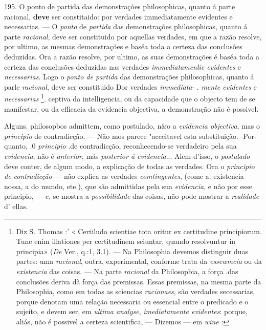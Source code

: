 195. O ponto de partida das demonstrações philosophicas, quanto á parte racional, \textbf{deve} ser constitaido: por verdades immediatamente evidentes e necessarias. --- O \emph{ponto} de \emph{partida} das demonstrações philosophicas, quanto á parte \emph{racional}, deve ser constituido por aquellas verdades, em que a razão resolve, por ultimo, as mesmas demonstrações e baséa toda a certeza das conclusões deduzidas. Ora a razão resolve, por ultimo, as suas demonstrações é baséa toda a certeza das conclusões deduzidas nas verdades \emph{immediatamenlie evidentes} e \emph{necessarias}. Logo o \emph{ponto de partida} das demonstrações philosophicas, quanto á parle \emph{racional}, deve ser constituido Dor verdades \emph{immediata}- . \emph{mente evidentes} e \emph{necessarias} \footnote{Diz S. Thomas :' « Certiludo scientiae tota oritur ex certitudine principiorum. Tune enim illationes per certitudinem sciuntar, quando resolvuntur in principia» (\emph{De} Ver., q.:1, 3.1). --- Na Philosophia devemos distinguir duas partes: uma \emph{racional}, outra, experimental, conforme trata da \emph{essewmcia} ou da \emph{existencia} das coisas. --- Na parte \emph{racional} da Philosopbia, a força .das conclusões deriva dà força das premissas. Essas premissas, na mesma parte da Philosophia, como em todas as sciencias \emph{racionaes}, são verdades secessarias, porque denotam uma relação necessaria ou essencial entre o predicado e o sujeito, e devem ser, em \emph{ultima analyse}, \emph{imediatamente evidentes}: porque, aliás, não é possivel a certeza scientifica, --- Dizemos --- em \emph{wine} :}. ceptiva da intelligencia, ou da capacidade que o objecto tem de se manifestar, ou da efficacia da evidencia objectiva, a demonstração não é possivel.

Alguns. philosopbos admittem, como postulado, n\&o a \emph{evidencia objectiva}, mas o \emph{principio} de contradicção. --- Não mos parece "acceitavel esta substituição. -Por- quanto, .0 \emph{principio} .de contradicção, reconhecendo-se verdadeiro pela sua \emph{evidencia}, não é \emph{anterior}, más \emph{posterior á evidencia}... Alem d'isso, o \emph{postulado} deve conter, de algum modo, a explicação de todas as verdades. Ora o \emph{principio de contradicção} --- não explica as verdades \emph{comtingentes}, (come a. existencia nossa, a do mundo, ete.), que são admittidas pela sua \emph{evidencia}, e não por esse principio, --- c, se mostra a \emph{possibilidade} das coisas, não pode mostrar a \emph{realidade} d' ellas.

